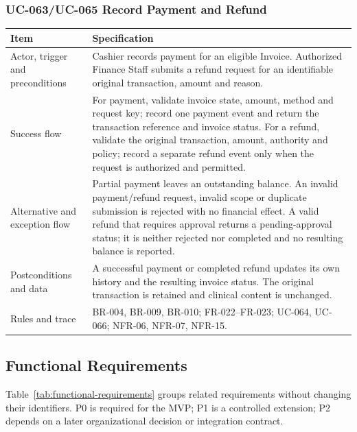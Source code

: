 \documentclass[a4paper,12pt]{article}
\begin{document}
\subsubsection{UC-063/UC-065 Record Payment and Refund}
\begin{longtable}{@{}p{}p{}@{}}
\toprule Item & Specification \\
\midrule
Actor, trigger and preconditions & Cashier records payment for an eligible Invoice. Authorized Finance Staff submits a refund request for an identifiable original transaction, amount and reason. \\
Success flow & For payment, validate invoice state, amount, method and request key; record one payment event and return the transaction reference and invoice status. For a refund, validate the original transaction, amount, authority and policy; record a separate refund event only when the request is authorized and permitted. \\
Alternative and exception flow & Partial payment leaves an outstanding balance. An invalid payment/refund request, invalid scope or duplicate submission is rejected with no financial effect. A valid refund that requires approval returns a pending-approval status; it is neither rejected nor completed and no resulting balance is reported. \\
Postconditions and data & A successful payment or completed refund updates its own history and the resulting invoice status. The original transaction is retained and clinical content is unchanged. \\
Rules and trace & BR-004, BR-009, BR-010; FR-022--FR-023; UC-064, UC-066; NFR-06, NFR-07, NFR-15. \\
\bottomrule
\end{longtable}

\subsection{Functional Requirements}
Table~\ref{tab:functional-requirements} groups related requirements without changing their identifiers. P0 is required for the MVP; P1 is a controlled extension; P2 depends on a later organizational decision or integration contract.
\end{document}
